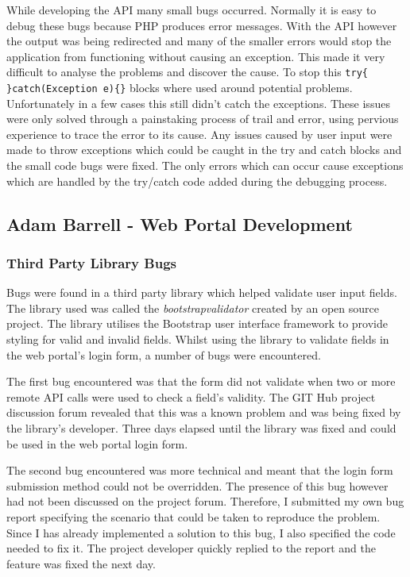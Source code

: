 \documentclass[11pt,a4paper]{report}
\begin{document}
While developing the API many small bugs occurred. Normally it is easy to debug these bugs because PHP produces error messages. With the API however the output was being redirected and many of the smaller errors would stop the application from functioning without causing an exception.  This made it very difficult to analyse the problems and discover the cause. To stop this \lstinline$try{ }catch(Exception e){}$ blocks where used around potential problems. Unfortunately in a few cases this still didn't catch the exceptions. These issues were only solved through a painstaking process of trail and error, using pervious experience to trace the error to its cause. Any issues caused by user input were made to throw exceptions which could be caught in the try and catch blocks and the small code bugs were fixed. The only errors which can occur cause exceptions which are handled by the try/catch code added during the debugging process.

\subsection{Adam Barrell - Web Portal Development}

\subsubsection{Third Party Library Bugs}
Bugs were found in a third party library which helped validate user input fields. The library used was called the \emph{bootstrapvalidator}\cite{bootstrapvalidator} created by an open source project. The library utilises the Bootstrap user interface framework to provide styling for valid and invalid fields. Whilst using the library to validate fields in the web portal's login form, a number of bugs were encountered.

The first bug encountered was that the form did not validate when two or more remote API calls were used to check a field's validity. The GIT Hub project discussion forum revealed that this was a known problem and was being fixed by the library's developer. Three days elapsed until the library was fixed and could be used in the web portal login form.

The second bug encountered was more technical and meant that the login form submission method could not be overridden. The presence of this bug however had not been discussed on the project forum. Therefore, I submitted my own bug report specifying the scenario that could be taken to reproduce the problem. Since I has already implemented a solution to this bug, I also specified the code needed to fix it. The project developer quickly replied to the report and the feature was fixed the next day.
\end{document}
